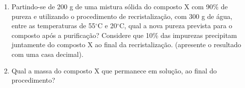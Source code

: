 \documentclass[a4paper,12]{exam}
\begin{document}
\begin{multicols}{2}
\begin{questions}
			\begin{enumerate}[label=\alph*)]

			\item Partindo-se de 200 g de uma mistura sólida do composto X com 90\% de pureza e utilizando o procedimento de recristalização, com 300 g de água, entre as temperaturas de 55$^{\circ}$C e 20$^{\circ}$C, qual a nova pureza prevista para o composto após a purificação? Considere que 10\% das impurezas precipitam juntamente do composto X ao final da recristalização. (apresente o resultado com uma casa decimal).
\makeemptybox{2cm}
			\item Qual a massa do composto X que permanece em solução, ao final do procedimento?
\makeemptybox{2cm}
			\end{enumerate}



	\end{questions}	
\end{multicols}
\end{document}
